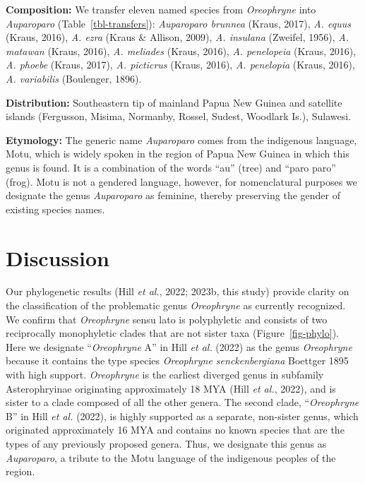 \documentclass[
  letterpaper,
  DIV=11,
  numbers=noendperiod]{scrartcl}
\begin{document}
\textbf{Composition:} We transfer eleven named species from
\emph{Oreophryne} into \emph{Auparoparo} (Table~\ref{tbl-transfers}):
\emph{Auparoparo brunnea} (Kraus, 2017), \emph{A. equus} (Kraus, 2016),
\emph{A. ezra} (Kraus \& Allison, 2009), \emph{A. insulana} (Zweifel,
1956), \emph{A. matawan} (Kraus, 2016), \emph{A. meliades} (Kraus,
2016), \emph{A. penelopeia} (Kraus, 2016), \emph{A. phoebe} (Kraus,
2017), \emph{A. picticrus} (Kraus, 2016), \emph{A. penelopia} (Kraus,
2016), \emph{A. variabilis} (Boulenger, 1896).

\textbf{Distribution:} Southeastern tip of mainland Papua New Guinea and
satellite islands (Fergusson, Misima, Normanby, Rossel, Sudest, Woodlark
Is.), Sulawesi.

\textbf{Etymology:} The generic name \emph{Auparoparo} comes from the
indigenous language, Motu, which is widely spoken in the region of Papua
New Guinea in which this genus is found. It is a combination of the
words ``au'' (tree) and ``paro paro'' (frog). Motu is not a gendered
language, however, for nomenclatural purposes we designate the genus
\emph{Auparoparo} as feminine, thereby preserving the gender of existing
species names.

\section{Discussion}\label{discussion}

Our phylogenetic results (Hill \emph{et al.}, 2022; 2023b, this study)
provide clarity on the classification of the problematic genus
\emph{Oreophryne} as currently recognized. We confirm that
\emph{Oreophryne} sensu lato is polyphyletic and consists of two
reciprocally monophyletic clades that are not sister taxa
(Figure~\ref{fig-phylo}). Here we designate ``\emph{Oreophryne} A'' in
Hill \emph{et al.} (2022) as the genus \emph{Oreophryne} because it
contains the type species \emph{Oreophryne senckenbergiana} Boettger
1895 with high support. \emph{Oreophryne} is the earliest diverged genus
in subfamily Asterophryinae originating approximately 18 MYA (Hill
\emph{et al.}, 2022), and is sister to a clade composed of all the other
genera. The second clade, ``\emph{Oreophryne} B'' in Hill \emph{et al.}
(2022), is highly supported as a separate, non-sister genus, which
originated approximately 16 MYA and contains no known species that are
the types of any previously proposed genera. Thus, we designate this
genus as \emph{Auparoparo}, a tribute to the Motu language of the
indigenous peoples of the region.
\end{document}
